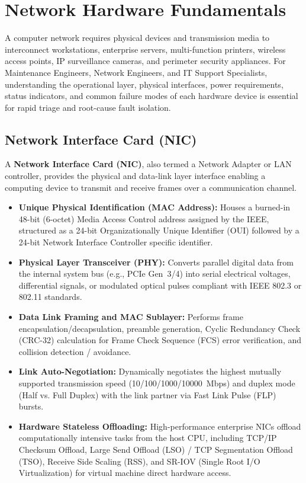 \section{Network Hardware Fundamentals}

A computer network requires physical devices and transmission media to interconnect workstations, enterprise servers, multi-function printers, wireless access points, IP surveillance cameras, and perimeter security appliances. For Maintenance Engineers, Network Engineers, and IT Support Specialists, understanding the operational layer, physical interfaces, power requirements, status indicators, and common failure modes of each hardware device is essential for rapid triage and root-cause fault isolation.

\subsection{Network Interface Card (NIC)}
A \textbf{Network Interface Card (NIC)}, also termed a Network Adapter or LAN controller, provides the physical and data-link layer interface enabling a computing device to transmit and receive frames over a communication channel.

\begin{keyconcept}
\begin{itemize}[leftmargin=*]
    \item \textbf{Unique Physical Identification (MAC Address):} Houses a burned-in 48-bit (6-octet) Media Access Control address assigned by the IEEE, structured as a 24-bit Organizationally Unique Identifier (OUI) followed by a 24-bit Network Interface Controller specific identifier.
    \item \textbf{Physical Layer Transceiver (PHY):} Converts parallel digital data from the internal system bus (e.g., PCIe Gen~3/4) into serial electrical voltages, differential signals, or modulated optical pulses compliant with IEEE 802.3 or 802.11 standards.
    \item \textbf{Data Link Framing and MAC Sublayer:} Performs frame encapsulation/decapsulation, preamble generation, Cyclic Redundancy Check (CRC-32) calculation for Frame Check Sequence (FCS) error verification, and collision detection / avoidance.
    \item \textbf{Link Auto-Negotiation:} Dynamically negotiates the highest mutually supported transmission speed (10/100/1000/10000~Mbps) and duplex mode (Half vs. Full Duplex) with the link partner via Fast Link Pulse (FLP) bursts.
    \item \textbf{Hardware Stateless Offloading:} High-performance enterprise NICs offload computationally intensive tasks from the host CPU, including TCP/IP Checksum Offload, Large Send Offload (LSO) / TCP Segmentation Offload (TSO), Receive Side Scaling (RSS), and SR-IOV (Single Root I/O Virtualization) for virtual machine direct hardware access.
\end{itemize}
\end{keyconcept}

